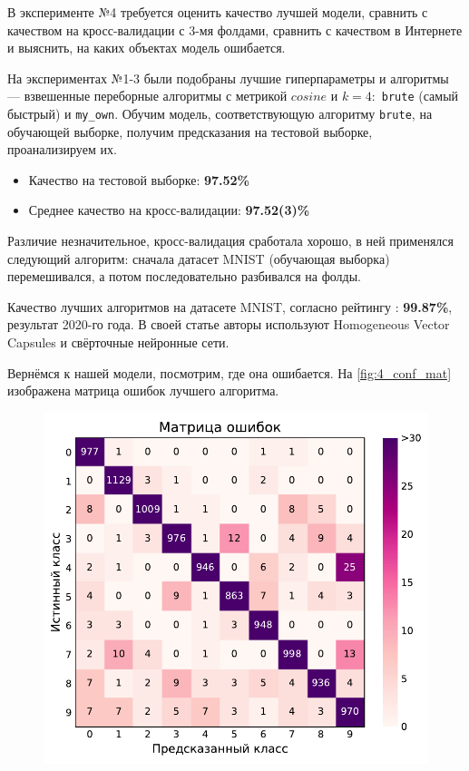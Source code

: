 \documentclass[12pt]{article}
\begin{document}
В эксперименте №4 требуется оценить качество лучшей модели, сравнить с качеством на кросс-валидации с 3-мя фолдами, сравнить с качеством в Интернете и выяснить, на каких объектах модель ошибается.

На экспериментах №1-3 были подобраны лучшие гиперпараметры и алгоритмы --- взвешенные переборные алгоритмы с метрикой $cosine$ и $k = 4$:~\verb|brute| (самый быстрый) и \verb|my_own|. Обучим модель, соответствующую алгоритму \verb|brute|, на обучающей выборке, получим предсказания на тестовой выборке, проанализируем их.

\begin{itemize} 
        \item Качество на тестовой выборке: \textbf{97.52\%}
        \item Среднее качество на кросс-валидации: \textbf{97.52(3)\%}
\end{itemize} 
Различие незначительное, кросс-валидация сработала хорошо, в ней применялся следующий алгоритм:
сначала датасет MNIST (обучающая выборка) перемешивался, а потом последовательно разбивался на фолды.


Качество лучших алгоритмов на датасете MNIST, согласно рейтингу \cite{topmnist}: \textbf{99.87\%}, результат 2020-го года. В своей статье \cite{byerly2020branching} авторы используют Homogeneous Vector Capsules и свёрточные нейронные сети.


Вернёмся к нашей модели, посмотрим, где она ошибается.
На \autoref{fig:4_conf_mat} изображена матрица ошибок лучшего алгоритма.
\begin{figure}[h]
    \centering
    \includegraphics{4_conf_mat}
    \caption{}
    \label{fig:4_conf_mat}
\end{figure}
\end{document}
